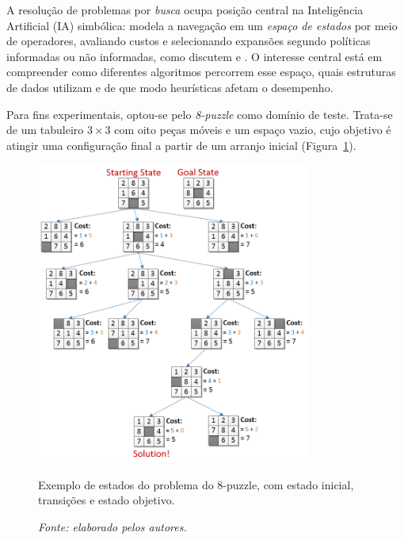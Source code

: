   
A resolução de problemas por \emph{busca} ocupa posição central na Inteligência Artificial (IA) simbólica: modela a navegação em um \emph{espaço de estados} por meio de operadores, avaliando custos e selecionando expansões segundo políticas informadas ou não informadas, como discutem  e . O interesse central está em compreender como diferentes algoritmos percorrem esse espaço, quais estruturas de dados utilizam e de que modo heurísticas afetam o desempenho.  
  
Para fins experimentais, optou-se pelo \emph{8-puzzle} como domínio de teste. Trata-se de um tabuleiro $3\times 3$ com oito peças móveis e um espaço vazio, cujo objetivo é atingir uma configuração final a partir de um arranjo inicial (Figura~\ref{fig:8puzzle}).   
  
\begin{figure}[H]  
    \centering  
    \includegraphics[width=0.8\textwidth]{Imagens/8puzzle7.png}  
    \caption{Exemplo de estados do problema do 8-puzzle, com estado inicial, transições e estado objetivo.}  
    \caption*{\textit{Fonte: elaborado pelos autores.}}  
    \label{fig:8puzzle}  
\end{figure}  
  
